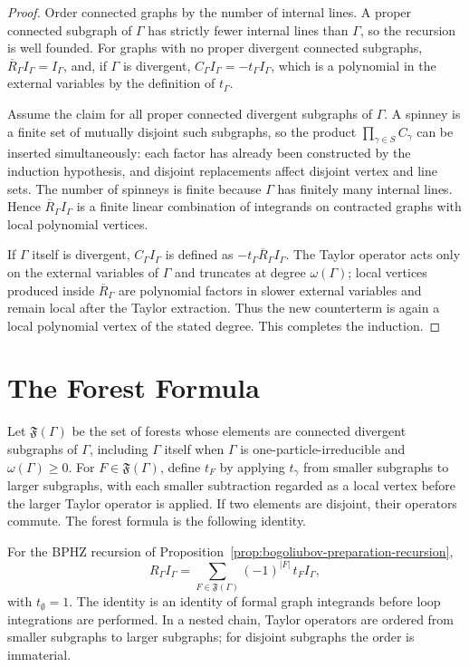 \begin{proof}
Order connected graphs by the number of internal lines.  A proper connected
subgraph of \(\Gamma\) has strictly fewer internal lines than \(\Gamma\), so
the recursion is well founded.  For graphs with no proper divergent connected
subgraphs, \(\overline R_\Gamma I_\Gamma=I_\Gamma\), and, if \(\Gamma\) is
divergent, \(C_\Gamma I_\Gamma=-t_\Gamma I_\Gamma\), which is a polynomial in
the external variables by the definition of \(t_\Gamma\).

Assume the claim for all proper connected divergent subgraphs of
\(\Gamma\).  A spinney is a finite set of mutually disjoint such subgraphs,
so the product \(\prod_{\gamma\in S}C_\gamma\) can be inserted
simultaneously: each factor has already been constructed by the induction
hypothesis, and disjoint replacements affect disjoint vertex and line sets.
The number of spinneys is finite because \(\Gamma\) has finitely many internal
lines.  Hence \(\overline R_\Gamma I_\Gamma\) is a finite linear combination
of integrands on contracted graphs with local polynomial vertices.

If \(\Gamma\) itself is divergent, \(C_\Gamma I_\Gamma\) is defined as
\(-t_\Gamma\overline R_\Gamma I_\Gamma\).  The Taylor operator acts only on
the external variables of \(\Gamma\) and truncates at degree
\(\omega(\Gamma)\); local vertices produced inside \(\overline R_\Gamma\)
are polynomial factors in slower external variables and remain local after
the Taylor extraction.  Thus the new counterterm is again a local polynomial
vertex of the stated degree.  This completes the induction.
\end{proof}

\section{The Forest Formula}

Let \(\mathfrak F(\Gamma)\) be the set of forests whose elements are connected
divergent subgraphs of \(\Gamma\), including \(\Gamma\) itself when
\(\Gamma\) is one-particle-irreducible and \(\omega(\Gamma)\ge0\).  For
\(F\in\mathfrak F(\Gamma)\), define \(t_F\) by applying \(t_\gamma\) from
smaller subgraphs to larger subgraphs, with each smaller subtraction regarded
as a local vertex before the larger Taylor operator is applied.  If two
elements are disjoint, their operators commute.  The forest formula is the
following identity.
\begin{theorem}
\label{thm:zimmermann-forest-formula}
For the BPHZ recursion of
Proposition~\ref{prop:bogoliubov-preparation-recursion},
\begin{equation*}
  R_\Gamma I_\Gamma
  =
  \sum_{F\in\mathfrak F(\Gamma)}
  (-1)^{|F|}\,t_F I_\Gamma ,
\tag{\(\ast\)}
\label{eq:zimmermann-forest-formula}
\end{equation*}
with \(t_\emptyset=1\).  The identity is an identity of formal graph
integrands before loop integrations are performed.  In a nested chain,
Taylor operators are ordered from smaller subgraphs to larger subgraphs; for
disjoint subgraphs the order is immaterial.
\end{theorem}

